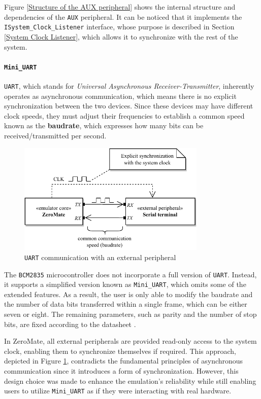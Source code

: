 \documentclass[english, ing, kiv, he, iso690numb, pdf]{fasthesis}
\begin{document}
	Figure \ref{Structure of the AUX peripheral} shows the internal structure and dependencies of the \texttt{AUX} peripheral. It can be noticed that it implements the \texttt{ISystem\_Clock\_Listener} interface, whose purpose is described in Section \ref{System Clock Listener}, which allows it to synchronize with the rest of the system.
	
	\paragraph{\texttt{Mini\_UART}}
	
	\texttt{UART}, which stands for \textit{Universal Asynchronous Receiver-Transmitter}, inherently operates as asynchronous communication, which means there is no explicit synchronization between the two devices. Since these devices may have different clock speeds, they must adjust their frequencies to establish a common speed known as the \textbf{baudrate}, which expresses how many bits can be received/transmitted per second.
	
	\begin{figure}[ht]
		\centering
		\includegraphics[width=0.8\textwidth]{img/diagrams/mini_uart_2.pdf}
		\caption{\texttt{UART} communication with an external peripheral}
		\label{UART communication with an external peripheral}
	\end{figure}
	
	The \texttt{BCM2835} microcontroller does not incorporate a full version of \texttt{UART}. Instead, it supports a simplified version known as \texttt{Mini\_UART}, which omits some of the extended features. As a result, the user is only able to modify the baudrate and the number of data bits transferred within a single frame, which can be either seven or eight. The remaining parameters, such as parity and the number of stop bits, are fixed according to the datasheet \cite{BCM2835}.
	
	\begin{important}
		In ZeroMate, all external peripherals are provided read-only access to the system clock, enabling them to synchronize themselves if required. This approach, depicted in Figure \ref{UART communication with an external peripheral}, contradicts the fundamental principles of asynchronous communication since it introduces a form of synchronization. However, this design choice was made to enhance the emulation's reliability while still enabling users to utilize \texttt{Mini\_UART} as if they were interacting with real hardware.
	\end{important}
	
\end{document}
